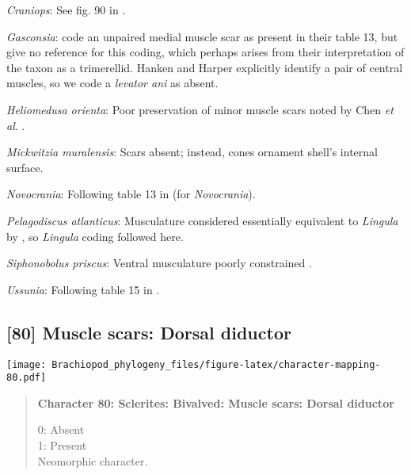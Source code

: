 \documentclass[openany]{book}
\theoremstyle{definition}
\theoremstyle{definition}
\theoremstyle{definition}
\theoremstyle{remark}
\begin{document}
\hypertarget{Craniops-coding-79}{}
\emph{Craniops}: See fig. 90 in
\citet{Williams2000LinguliformeaCraniiformea}.

\hypertarget{Gasconsia-coding-79}{}
\emph{Gasconsia}: \citet{Williams2000LinguliformeaCraniiformea} code an
unpaired medial muscle scar as present in their table 13, but give no
reference for this coding, which perhaps arises from their
interpretation of the taxon as a trimerellid. Hanken and Harper
\citeyearpar[p.~249 and text-fig. 2]{Hanken1985Thetaxonomy} explicitly
identify a pair of central muscles, so we code a \emph{levator ani} as
absent.

\hypertarget{Heliomedusa_orienta-coding-79}{}
\emph{Heliomedusa orienta}: Poor preservation of minor muscle scars
noted by Chen \emph{et al}. \citeyearpar{Chen2007Reinterpretationof}.

\hypertarget{Mickwitzia_muralensis-coding-79}{}
\emph{Mickwitzia muralensis}: Scars absent; instead, cones ornament
shell's internal surface.

\hypertarget{Novocrania-coding-79}{}
\emph{Novocrania}: Following table 13 in
\citet{Williams2000LinguliformeaCraniiformea} (for \emph{Novocrania}).

\hypertarget{Pelagodiscus_atlanticus-coding-79}{}
\emph{Pelagodiscus atlanticus}: Musculature considered essentially
equivalent to \emph{Lingula} by
\citet{Williams2000LinguliformeaCraniiformea}, so \emph{Lingula} coding
followed here.

\hypertarget{Siphonobolus_priscus-coding-79}{}
\emph{Siphonobolus priscus}: Ventral musculature poorly constrained
\citep{Williams2000LinguliformeaCraniiformea, Popov2009Earlyontogeny}.

\hypertarget{Ussunia-coding-79}{}
\emph{Ussunia}: Following table 15 in
\citet{Williams2000LinguliformeaCraniiformea}.

\subsection*{{[}80{]} Muscle scars: Dorsal
diductor}\label{muscle-scars-dorsal-diductor}

\texttt{[image: Brachiopod\_phylogeny\_files/figure-latex/character-mapping-80.pdf]}

\begin{quote}
\textbf{Character 80: Sclerites: Bivalved: Muscle scars: Dorsal
diductor}

0: Absent\\
1: Present\\
Neomorphic character.
\end{quote}
\end{document}
